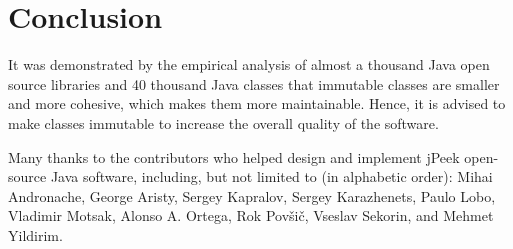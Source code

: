 \documentclass[sigconf,10pt,nonacm=true]{acmart}
\begin{document}
\section{Conclusion}

It was demonstrated by the empirical analysis of almost a thousand
Java open source libraries and 40 thousand Java classes
that immutable classes are smaller and more cohesive, which
makes them more maintainable. Hence, it is advised to make classes
immutable to increase the overall quality of the software.

Many thanks to the contributors who
helped design and implement jPeek open-source Java software, including,
but not limited to (in alphabetic order):
Mihai Andronache,
George Aristy,
Sergey Kapralov,
Sergey Karazhenets,
Paulo Lobo,
Vladimir Motsak,
Alonso A. Ortega,
Rok Pov\v{s}i\v{c},
Vseslav Sekorin,
and
Mehmet Yildirim.



\end{document}

